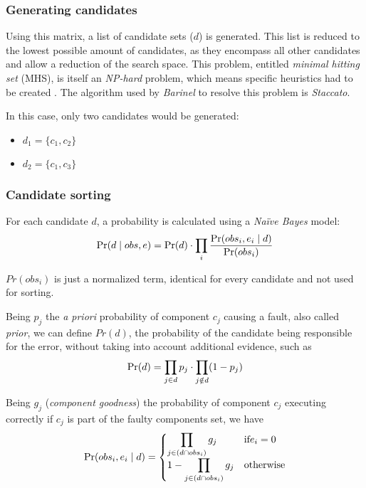 % 
%

\subsubsection{Generating candidates} 

Using this matrix, a list of candidate sets ($d$) is generated. This list is reduced to the lowest possible amount of candidates, as they encompass all other candidates and allow a reduction of the search space. This problem, entitled \emph{minimal hitting set} (MHS), is itself an \emph{NP-hard} problem, which means specific heuristics had to be created \cite{RuiAbreu, Cardoso2013}. The algorithm used by \emph{Barinel} to resolve this problem is \emph{Staccato}.

In this case, only two candidates would be generated:

\begin{itemize}
\item $d_1 = \{c_1, c_2\}$ 
\item $d_2 = \{c_1, c_3\}$ 
\end{itemize}

% 
%

\subsubsection{Candidate sorting} 

For each candidate $d$, a probability is calculated using a \emph{Naïve Bayes} model:
%
\begin{equation}
  \mbox{Pr}(d\mid obs,e) =  \mbox{Pr}(d) \cdot \prod_{i}\frac{\mbox{Pr}(obs_i, e_i \mid d)}{\mbox{Pr}(obs_i)}
\end{equation}


$Pr(obs_i)$ is just a normalized term, identical for every candidate and not used for sorting.

Being $p_j$ the \emph{a priori} probability of component $c_j$ causing a fault, also called \emph{prior}, we can define $Pr(d)$, the probability of the candidate being responsible for the error, without taking into account additional evidence, such as
%
\begin{equation}
  \mbox{Pr}(d) = \prod_{j \in d} p_j \cdot \prod_{j \notin d} (1 - p_j)
\end{equation}


Being $g_j$ (\emph{component goodness}) the probability of component $c_j$ executing correctly if $c_j$ is part of the faulty components set, we have
% 
\begin{equation}
  \mbox{Pr}(obs_i, e_i \mid  d) = 
  \begin{cases}
    \displaystyle\prod_{j \in (d \cap obs_i)} g_j    & \textrm{if} e_i = 0 \\
  1 - \displaystyle\prod_{j \in (d \cap obs_i)} g_j  & \textrm{otherwise}
  \end{cases}
\end{equation}

